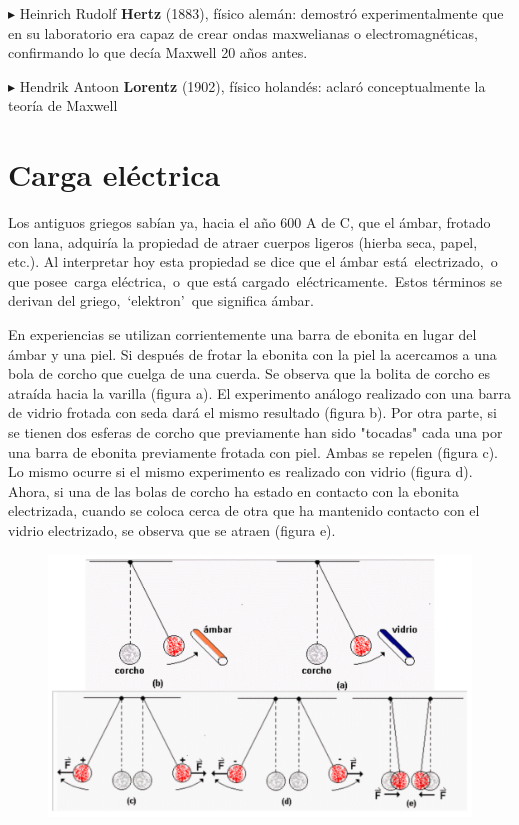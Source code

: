$\blacktriangleright$ Heinrich Rudolf  \textbf{Hertz} (1883), físico alemán: demostró experimentalmente que en su laboratorio era capaz de crear ondas maxwelianas o electromagnéticas, confirmando lo que decía Maxwell 20 años antes.

$\blacktriangleright$ Hendrik Antoon  \textbf{Lorentz} (1902), físico holandés: aclaró conceptualmente la teoría de Maxwell


\section{Carga eléctrica}

Los antiguos griegos sabían ya, hacia el año 600 A de C, que el ámbar, frotado con lana, adquiría la propiedad de atraer cuerpos ligeros (hierba seca, papel, etc.). Al interpretar hoy esta propiedad se dice que el ámbar está electrizado, o que posee carga eléctrica, o que está cargado eléctricamente. Estos términos se derivan del griego, `elektron' que significa ámbar.

En experiencias se utilizan corrientemente una barra de ebonita en lugar del ámbar y una piel. Si después de frotar la ebonita con la piel la acercamos a una bola de corcho que cuelga de una cuerda. Se observa que la bolita de corcho es atraída hacia la varilla (figura a). El experimento análogo realizado con una barra de vidrio frotada con seda dará el mismo resultado (figura b). Por otra parte, si se tienen dos esferas de corcho que previamente han sido "tocadas" cada una por una barra de ebonita previamente frotada con piel. Ambas se repelen (figura c). Lo mismo ocurre si el mismo experimento es realizado con vidrio (figura d).
Ahora, si una de las bolas de corcho ha estado en contacto con la ebonita electrizada, cuando se coloca cerca de otra que ha mantenido contacto con el vidrio electrizado, se observa que se atraen (figura e).

\begin{figure}[H]
		\centering
		\includegraphics[width=1\textwidth]{imagenes/imagenes22/T22IM02.png}
	\end{figure}

